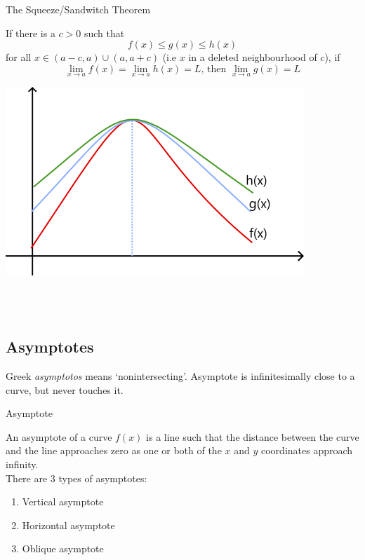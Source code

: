 \documentclass[12pt]{article}
\begin{document}
\begin{theorem}{The Squeeze/Sandwitch Theorem}
   
    If there is a $c>0$ such that \[
        f(x)\le g(x)\le h(x)
    \] for all $x\in(a-c,a)\cup(a,a+c)$ (i.e $x$ in a deleted neighbourhood of $c$), if \[
        \lim_{x \to a} f(x) = \lim_{x \to a} h(x) = L \text{, then } \lim_{x \to a} g(x) = L
    \]
    \begin{center}
        \includegraphics[scale=0.5]{SqueezeTheorem.png}
    \end{center}
\end{theorem} \\~\\



\subsection{Asymptotes}
Greek \textit{asymptotos} means `nonintersecting'. Asymptote is infinitesimally close to a curve, but never touches it.

\begin{definition}{Asymptote}

    An asymptote of a curve $f(x)$ is a line such that the distance between the curve and the line approaches zero as one or both of the $x$ and $y$ coordinates approach infinity. \\
    There are 3 types of asymptotes:
    \begin{enumerate}
        \item Vertical asymptote
        \item Horizontal asymptote
        \item Oblique asymptote
    \end{enumerate}
\end{definition}
\end{document}
